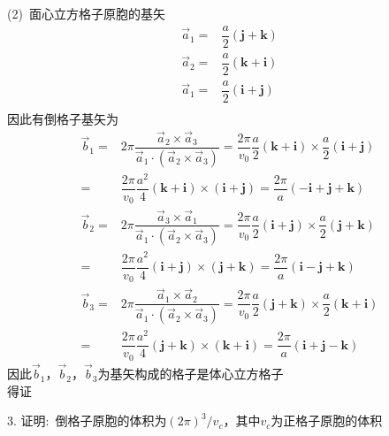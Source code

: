 (2)~面心立方格子原胞的基矢
\begin{displaymath}
	\begin{aligned}
		\vec a_1=&\dfrac{a}2(\mathbf{j}+\mathbf{k})\\
		\vec a_2=&\dfrac{a}2(\mathbf{k}+\mathbf{i})\\
		\vec a_1=&\dfrac{a}2(\mathbf{i}+\mathbf{j})\\
	\end{aligned}
\end{displaymath}
因此有倒格子基矢为
\begin{displaymath}
	\begin{aligned}
		\vec b_1=&2\pi\dfrac{\vec a_2\times\vec a_3}{\vec a_1\cdot(\vec a_2\times\vec a_3)}=\dfrac{2\pi}{v_0}\dfrac{a}2(\mathbf{k}+\mathbf{i})\times\dfrac{a}2(\mathbf{i}+\mathbf{j})\\
		=&\dfrac{2\pi}{v_0}\dfrac{a^2}4(\mathbf{k}+\mathbf{i})\times(\mathbf{i}+\mathbf{j})=\dfrac{2\pi}a(-\mathbf{i}+\mathbf{j}+\mathbf{k})\\
		\vec b_2=&2\pi\dfrac{\vec a_3\times\vec a_1}{\vec a_1\cdot(\vec a_2\times\vec a_3)}=\dfrac{2\pi}{v_0}\dfrac{a}2(\mathbf{i}+\mathbf{j})\times\dfrac{a}2(\mathbf{j}+\mathbf{k})\\
		=&\dfrac{2\pi}{v_0}\dfrac{a^2}4(\mathbf{i}+\mathbf{j})\times(\mathbf{j}+\mathbf{k})=\dfrac{2\pi}a(\mathbf{i}-\mathbf{j}+\mathbf{k})\\
		\vec b_3=&2\pi\dfrac{\vec a_1\times\vec a_2}{\vec a_1\cdot(\vec a_2\times\vec a_3)}=\dfrac{2\pi}{v_0}\dfrac{a}2(\mathbf{j}+\mathbf{k})\times\dfrac{a}2(\mathbf{k}+\mathbf{i})\\
		=&\dfrac{2\pi}{v_0}\dfrac{a^2}4(\mathbf{j}+\mathbf{k})\times(\mathbf{k}+\mathbf{i})=\dfrac{2\pi}a(\mathbf{i}+\mathbf{j}-\mathbf{k})
	\end{aligned}
\end{displaymath}
因此$\vec b_1$，$\vec b_2$，$\vec b_3$为基矢构成的格子是体心立方格子\\得证

3. 证明:~倒格子原胞的体积为$(2\pi)^3/v_c$，其中$v_c$为正格子原胞的体积

